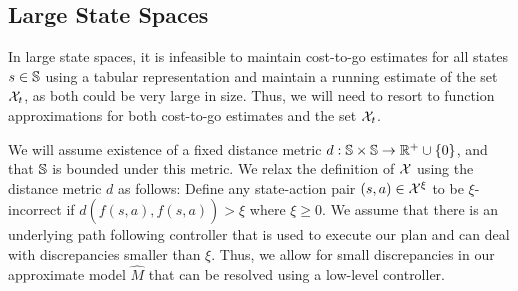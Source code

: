 \subsection{Large State Spaces}
\label{sec:large-state-spaces}

In large state spaces, it is infeasible to
maintain cost-to-go estimates for all states $s \in \mathbb{S}$ using
a tabular representation and maintain a running estimate of the set
$\mathcal{X}_t$, as both
could be very large in size. Thus,
we will need to resort to function approximations for both
cost-to-go estimates and the set $\mathcal{X}_t$.

We will assume existence of a fixed distance metric $d:
\mathbb{S} \times \mathbb{S} \rightarrow \mathbb{R}^+\cup\{0\}$, and that
$\mathbb{S}$ is bounded under this metric.
We relax the definition of $\mathcal{X}$ using the distance
metric $d$ as follows: Define any state-action pair $(s, a) \in
\mathcal{X}^\xi$ to be $\xi$-incorrect if $d(f(s, a), \hat{f}(s, a))
> \xi$ where $\xi \geq  0$. We assume that there is an underlying
path following controller that is used to execute our plan and can deal with
discrepancies smaller than $\xi$. Thus, we allow for small
discrepancies in our approximate model $\hat{M}$ that can be resolved
using a low-level controller.


